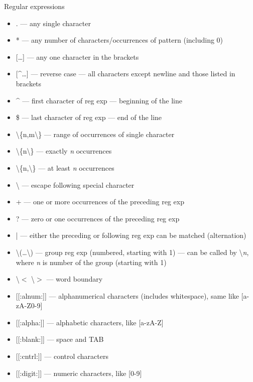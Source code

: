 \documentclass[compress, ucs, xelatex, 11pt, xcolor=svgnames,
  hyperref={
    bookmarks=true,
    unicode=true,
    colorlinks=true,
    pdftitle={Linux, command line and MetaCentrum},
    plainpages=false,
    pdfauthor={Vojtech Zeisek},
    pdfsubject={Course about use of Linux command line, writing shell scripts and using MetaCentrum of CESNET},
    pdfcreator={XeLaTeX, http://www.xelatex.org/},
    pdfkeywords={Linux, GNU, BASH, shell, command line, MetaCentrum},
    linkcolor=Sienna,
    anchorcolor=black,
    citecolor=green,
    filecolor=magenta,
    menucolor=Sienna,
    urlcolor=cyan,
    pdftex},
  url={hyphens, lowtilde} %
  ]{beamer}
\begin{document}
\begin{frame}[allowframebreaks]{Regular expressions}
\label{regexp}
\begin{itemize}
  \item \alert{.} --- any single character
  \item \alert{*} --- any number of characters/occurrences of pattern (including 0)
  \item \alert{[\ldots]} --- any one character in the brackets
  \item \alert{[\textasciicircum\ldots]} --- reverse case --- all characters except newline and those listed in brackets
  \item \alert{\textasciicircum} --- first character of reg exp --- beginning of the line
  \item \alert{\$} --- last character of reg exp --- end of the line
  \item \alert{\textbackslash\{n,m\textbackslash\}} --- range of occurrences of single character
  \item \alert{\textbackslash\{n\textbackslash\}} --- exactly \textit{n} occurrences
  \item \alert{\textbackslash\{n,\textbackslash\}} --- at least \textit{n} occurrences
  \item \alert{\textbackslash} --- escape following special character
  \item \alert{+} --- one or more occurrences of the preceding reg exp
  \item \alert{?} --- zero or one occurrences of the preceding reg exp
  \item \alert{|} --- either the preceding or following reg exp can be matched (alternation)
  \item \alert{\textbackslash(\ldots\textbackslash)} --- group reg exp (numbered, starting with 1) --- can be called by \alert{\textbackslash\textit{n}}, where \textit{n} is number of the group (starting with 1)
  \item \alert{\textbackslash$<$ \textbackslash$>$} --- word boundary
  \item \alert{[[:alnum:]]} --- alphanumerical characters (includes whitespace), same like \alert{[a-zA-Z0-9]}
  \item \alert{[[:alpha:]]} --- alphabetic characters, like \alert{[a-zA-Z]}
  \item \alert{[[:blank:]]} --- space and TAB
  \item \alert{[[:cntrl:]]} --- control characters
  \item \alert{[[:digit:]]} --- numeric characters, like \alert{[0-9]}

\end{itemize}
\end{frame}
\end{document}
